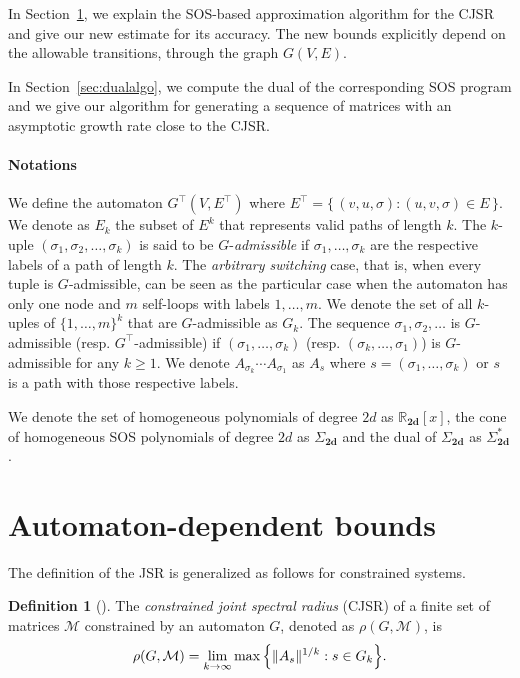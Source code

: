 \documentclass{sig-alternate-05-2015}
\newcommand{\1}{\mathbf{1}}
\newcommand{\Rh}{\R_{\mathbf{2d}}}
\newcommand{\Sh}{\Sigma_{\mathbf{2d}}}
\newcommand{\Shs}{\Sigma_{\mathbf{2d}}^*}
\theoremstyle{definition}
\newtheorem{mydef}{Definition}
\newcommand{\R}{\mathbb{R}}
\newcommand{\Tr}{\top}
\newcommand{\A}{\mathcal{M}}
\newcommand{\G}{G}
\newcommand{\cjsr}{\rho(\G,\A)}
\newcommand{\Sect}{Section~}
\newcommand{\Nodes}{V}
\newcommand{\Arcs}{E}
\newcommand{\defAG   }{a finite set of matrices $\A$ constrained by an automaton $\G$}
\begin{document}
In \Sect\ref{sec:primal}, we explain the SOS-based approximation
algorithm for the CJSR and give our new estimate for its accuracy.
The new bounds explicitly depend on the allowable transitions, through
the graph $G(V,E)$.

In \Sect\ref{sec:dualalgo}, we compute the dual of the corresponding
SOS program and we give our algorithm for generating a sequence of
matrices with an asymptotic growth rate close to the CJSR.

\paragraph{Notations}
We define the automaton $\G^\Tr (\Nodes,\Arcs^\Tr )$ where
\(\Arcs^\Tr  = \{\, (v,u,\sigma) : (u,v,\sigma) \in \Arcs \,\}.\)
We denote as $\Arcs_k$ the subset of $\Arcs^k$ that represents valid paths of length $k$.
The $k$-uple $(\sigma_1, \sigma_2, \ldots, \sigma_k)$ is said to be $\G$-\emph{admissible} if $\sigma_1, \ldots, \sigma_k$ are the respective labels of a path of length $k$.
The \emph{arbitrary switching} case,
that is, when every tuple is $\G$-admissible,
can be seen as the particular case when the automaton has only one node and $m$ self-loops with labels $1, \ldots, m$.
We denote the set of all $k$-uples of $\{1, \ldots, m\}^k$ that are $\G$-admissible as $\G_k$.
The sequence $\sigma_1, \sigma_2, \ldots$ is $\G$-admissible (resp. $\G^\Tr $-admissible) if $(\sigma_1, \ldots, \sigma_k)$ (resp. $(\sigma_k, \ldots, \sigma_1)$) is $\G$-admissible for any $k \geq 1$.
We denote $A_{\sigma_k}\cdots A_{\sigma_1}$ as $A_s$ where $s = (\sigma_1, \ldots, \sigma_k)$ or $s$ is a path with those respective labels.

We denote the set of homogeneous polynomials of degree $2d$ as $\Rh[x]$,
the cone of homogeneous SOS polynomials of degree $2d$ as $\Sh$
and the dual of $\Sh$ as $\Shs$.

\section{Automaton-dependent bounds}
\label{sec:primal}

The definition of the JSR is generalized as follows for constrained systems.
\begin{mydef}[\cite{dai2012gel}]
  \label{def:cjsr}
  The \emph{constrained joint spectral radius} (CJSR) of
  \defAG{}, denoted as $\cjsr$,
  is
  \[ \cjsr = \lim_{k \to \infty}
    \max \Big\{ \|A_s\|^{1/k}\\: s \in \G_k \Big\}.
  \]
\end{mydef}
\end{document}
